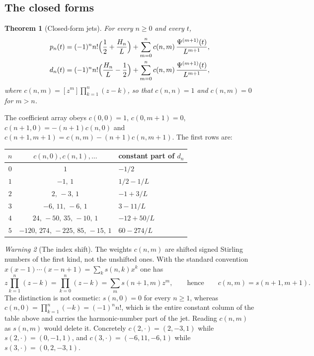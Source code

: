 \documentclass[11pt,oneside]{article}
\newtheorem{theorem}{Theorem}[section]
\theoremstyle{definition}
\theoremstyle{remark}
\newtheorem{warning}[theorem]{Warning}
\begin{document}
\subsection{The closed forms}

\begin{theorem}[Closed-form jets]\label{thm:jets}
For every $n\ge0$ and every $t$,
\[
\begin{aligned}
  p_n(t)&=(-1)^nn!\Bigl(\frac12+\frac{H_n}{L}\Bigr)
    +\sum_{m=0}^{n}c(n,m)\,\frac{\Psi^{(m+1)}(t)}{L^{m+1}},\\
  d_n(t)&=(-1)^nn!\Bigl(\frac{H_n}{L}-\frac12\Bigr)
    +\sum_{m=0}^{n}c(n,m)\,\frac{\Psi^{(m+1)}(t)}{L^{m+1}},
\end{aligned}
\]
where $c(n,m)=[z^m]\prod_{k=1}^n(z-k)$, so that $c(n,n)=1$ and $c(n,m)=0$ for
$m>n$.
\end{theorem}

The coefficient array obeys $c(0,0)=1$, $c(0,m+1)=0$,
$c(n+1,0)=-(n+1)c(n,0)$ and $c(n+1,m+1)=c(n,m)-(n+1)c(n,m+1)$.  The first rows
are:

\begin{center}
\begin{tabular}{@{}ccl@{}}
\toprule
$n$ & $c(n,0),c(n,1),\dots$ & constant part of $d_n$\\
\midrule
$0$ & $1$ & $-1/2$\\
$1$ & $-1,\,1$ & $1/2-1/L$\\
$2$ & $2,\,-3,\,1$ & $-1+3/L$\\
$3$ & $-6,\,11,\,-6,\,1$ & $3-11/L$\\
$4$ & $24,\,-50,\,35,\,-10,\,1$ & $-12+50/L$\\
$5$ & $-120,\,274,\,-225,\,85,\,-15,\,1$ & $60-274/L$\\
\bottomrule
\end{tabular}
\end{center}

\begin{warning}[The index shift]
The weights $c(n,m)$ are shifted signed Stirling numbers of the first kind,
not the unshifted ones.  With the standard convention
$x(x-1)\cdots(x-n+1)=\sum_k s(n,k)x^k$ one has
\[
  z\prod_{k=1}^{n}(z-k)=\prod_{k=0}^{n}(z-k)=\sum_{m}s(n+1,m)z^m,
  \qquad\text{hence}\qquad c(n,m)=s(n+1,m+1).
\]
The distinction is not cosmetic: $s(n,0)=0$ for every $n\ge1$, whereas
$c(n,0)=\prod_{k=1}^n(-k)=(-1)^nn!$, which is the entire constant column of
the table above and carries the harmonic-number part of the jet.  Reading
$c(n,m)$ as $s(n,m)$ would delete it.  Concretely $c(2,\cdot)=(2,-3,1)$ while
$s(2,\cdot)=(0,-1,1)$, and $c(3,\cdot)=(-6,11,-6,1)$ while
$s(3,\cdot)=(0,2,-3,1)$.
\end{warning}
\end{document}
